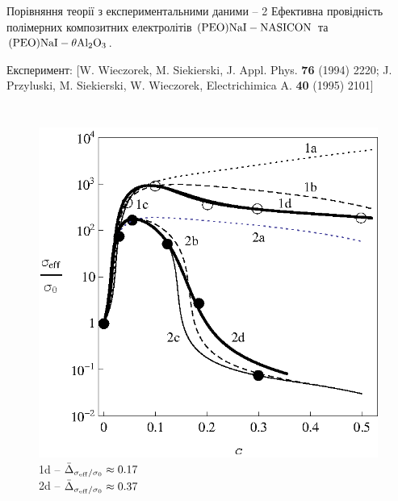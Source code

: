 \documentclass[10pt]{beamer}
\begin{document}
\begin{frame}{Порівняння теорії з експериментальними даними -- 2}
Ефективна провідність полімерних композитних електролітів $\rm (PEO)NaI-NASICON$ та $\rm (PEO)NaI-\theta Al_2O_3$.
\vspace{-5pt}

\scriptsize{Експеримент: [W. Wieczorek, M. Siekierski, J. Appl. Phys. {\bf 76} (1994) 2220; J. Przyluski, M. Siekierski, W. Wieczorek, Electrichimica A. {\bf 40} (1995) 2101]}
\vspace{-5pt}

\footnotesize
\begin{columns}[T,onlytextwidth]
      \begin{figure}
        \centering
        \includegraphics[width=0.99\textwidth]{images/Fig2_PEO-NaI_NASICON_PEO-NaI-theta-Al2O3.eps}
        1d -- $\bar{\Delta}_{\sigma_{\rm eff}/\sigma_0} \approx 0.17$\\
        2d -- $\bar{\Delta}_{\sigma_{\rm eff}/\sigma_0} \approx 0.37$
      \end{figure}


\end{columns}
\end{frame}
\end{document}
